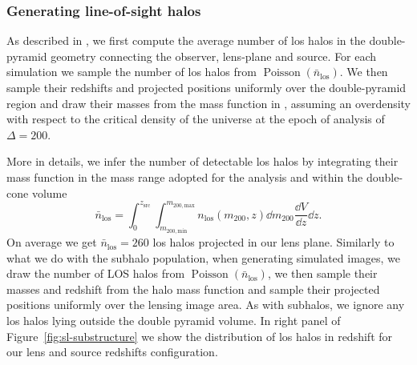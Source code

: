 \subsubsection{Generating line-of-sight halos}

As described in \cite[Figure 3]{CaganSengul:2020nat}, we first compute the average number of \gls*{los} halos in the double-pyramid geometry connecting the observer, lens-plane and source. For each simulation we sample the number of \gls*{los} halos from $\operatorname{Poisson}(\bar{n}_\mathrm{los})$. We then sample their redshifts and projected positions uniformly over the double-pyramid region and draw their masses from the mass function in \cite{Tinker:2008ff}, assuming an overdensity with respect to the critical density of the universe at the epoch of analysis of $\Delta=200$. 

More in details, we infer the number of detectable \gls*{los} halos by integrating their mass function in the mass range adopted for the analysis and within the double-cone volume
\begin{equation}
    \bar{n}_{\mathrm{los}}=\int_0^{z_\mathrm{src}}\int_{m_\mathrm{200,min}}^{m_\mathrm{200, max}} n_\mathrm{los}(m_\mathrm{200}, z)\dd{m_\mathrm{200}} \frac{\dd{V}}{\dd{z}}\dd z.
\end{equation}
On average we get $\bar{n}_{\mathrm{los}}=260$ \gls*{los} halos projected in our lens plane. Similarly to what we do with the subhalo population, when generating simulated images, we draw the number of LOS halos from $\operatorname{Poisson}(\bar{n}_\mathrm{los})$, we then sample their masses and redshift from the \cite{Tinker:2008ff} halo mass function and sample their projected positions uniformly over the lensing image area. As with subhalos, we ignore any \gls*{los} halos lying outside the double pyramid volume. In right panel of Figure~\ref{fig:sl-substructure} we show the distribution of \gls*{los} halos in redshift for our lens and source redshifts configuration.


